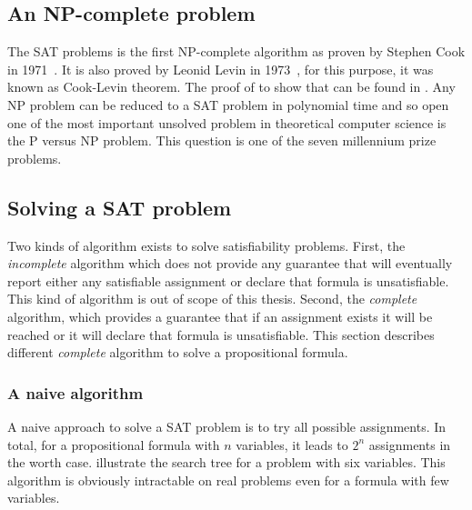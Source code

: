 \subsection{An NP-complete problem}

The SAT problems is the first NP-complete algorithm as proven by Stephen Cook in 1971~\cite{cook1971complexity}.
It is also proved by Leonid Levin in 1973~\cite{4640789}, for this purpose, it was known as Cook-Levin theorem.
The proof of to show that can be found in \cite{sipser2006introduction}.
Any NP problem can be reduced to a SAT problem in polynomial time and so open one of the most important 
unsolved problem in theoretical computer science is the P versus NP problem.
This question is one of the seven millennium prize problems.


%
%


\subsection{Solving a SAT problem}

Two kinds of algorithm exists to solve satisfiability problems.
First, the \emph{incomplete} algorithm which does not provide any guarantee that will eventually report either any satisfiable assignment or declare that formula is unsatisfiable. This kind of algorithm is out of scope of this thesis. 
Second, the \emph{complete} algorithm, which provides a guarantee that if an assignment exists
it will be reached or it will declare that formula is unsatisfiable.
This section describes different \emph{complete }algorithm to solve a propositional formula.



\subsubsection{A naive algorithm}
A naive approach to solve a SAT problem is to try all possible assignments. In total,
for a propositional formula with $n$ variables, it leads to $2^n$ assignments in the worth case.  
 illustrate the search tree for a problem with six variables.
This algorithm is obviously intractable on real problems even for a formula with few variables. \\


